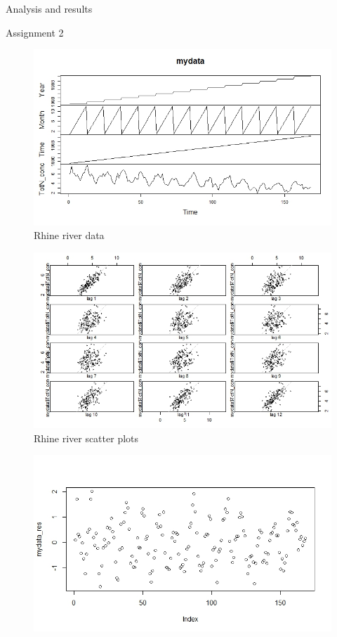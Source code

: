 \documentclass{article}
\begin{document}
\begin{section}{Analysis and results}
\begin{subsection}{Assignment 2}
\begin{figure}[ht!]
    \centering
    \includegraphics[scale=0.4]{mydata}
    \caption{Rhine river data}
    \label{fig:mydata}
\end{figure}
\begin{figure}[ht!]
    \centering
    \includegraphics[scale=0.4]{mydata_scatter}
    \caption{Rhine river scatter plots}
    \label{fig:mydata_scatter}
\end{figure}
\begin{figure}[ht!]
    \centering
    \includegraphics[scale=0.4]{mydata_res}

\end{figure}
\end{subsection}
\end{section}
\end{document}
